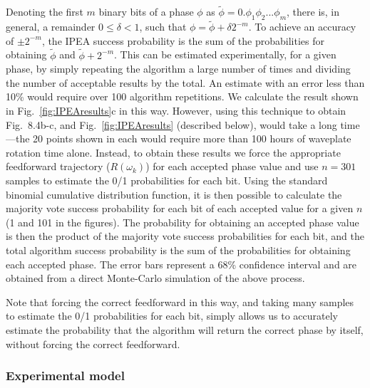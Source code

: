 \documentclass[11pt,oneside,final]{huthesis}%
\begin{document}
Denoting the first $m$ binary bits of a phase $\phi$ as
$\tilde{\phi}=0.\phi_1\phi_2...\phi_m$, there is, in general, a remainder $0\leq
\delta < 1$, such that $\phi=\tilde{\phi}+\delta2^{-m}$. To achieve an accuracy
of $\pm{2^{-m}}$, the IPEA success probability is the sum of the probabilities
for obtaining $\tilde{\phi}$ and $\tilde{\phi}+2^{-m}$. This can be estimated
experimentally, for a given phase, by simply repeating the algorithm a large
number of times and dividing the number of acceptable results by the total. An
estimate with an error less than 10\% would require over 100 algorithm
repetitions. We calculate the result shown in Fig.~\ref{fig:IPEAresults}c in this way. However,
using this technique to obtain Fig.~8.4b-c, and Fig.~\ref{fig:IPEAresults} (described below), 
would
take a long time---the 20 points shown in each would require more than 100 hours
of waveplate rotation time alone. Instead, to obtain these results we force the
appropriate feedforward trajectory ($R(\omega_k)$) for each accepted phase value
and use $n=301$ samples to estimate the 0/1 probabilities for each bit. Using
the standard binomial cumulative distribution function, it is then possible to calculate
the majority vote success probability for each bit of each accepted value for a
given $n$ (1 and 101 in the figures). The probability for obtaining an accepted
phase value is then the product of the majority vote success probabilities for
each bit, and the total algorithm success probability is the sum of the
probabilities for obtaining each accepted phase. The error bars represent a 68\%
confidence interval and are obtained from a direct Monte-Carlo simulation of the
above process.

Note that forcing the correct feedforward in this way, and taking many samples
to estimate the 0/1 probabilities for each bit, simply allows us to accurately
estimate the probability that the algorithm will return the correct phase by
itself, without forcing the correct feedforward.



\subsubsection{Experimental model}
\end{document}
